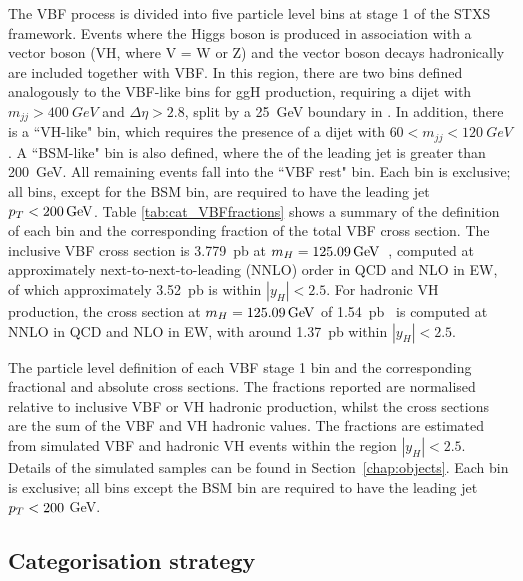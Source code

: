 The VBF process is divided into five particle level bins at stage 1 of the STXS framework.
Events where the Higgs boson is produced in association with a vector boson (VH, where V = W or Z) 
and the vector boson decays hadronically are included together with VBF.
In this region, there are two bins defined analogously to the VBF-like bins for ggH production, 
requiring a dijet with $m_{jj} > \SI{400}{GeV}$ and $\Delta\eta > 2.8$, 
split by a \SI{25}{GeV} boundary in \ptHjj.
In addition, there is a ``VH-like" bin, 
which requires the presence of a dijet with $60 < m_{jj} < \SI{120}{GeV}$. 
A ``BSM-like" bin is also defined, where the \pt of the leading jet is greater than \SI{200}{GeV}.
All remaining events fall into the ``VBF rest" bin.
Each bin is exclusive; all bins, except for the BSM bin, 
are required to have the leading jet $p_T < \SI{200}{GeV}$.
Table \ref{tab:cat_VBFfractions} shows a summary of the definition of each bin 
and the corresponding fraction of the total VBF cross section.
The inclusive VBF cross section is \SI{3.779}{pb} at $m_{H} = \SI{125.09}{GeV}$~\cite{YR4},
computed at approximately next-to-next-to-leading (NNLO) order in QCD and NLO in EW,
of which approximately \SI{3.52}{pb} is within $|y_H| < 2.5$.
For hadronic VH production, 
the cross section at $m_{H} = \SI{125.09}{GeV}$ of \SI{1.54}{pb}~\cite{YR4}
is computed at NNLO in QCD and NLO in EW, 
with around \SI{1.37}{pb} within $|y_H| < 2.5$.

\begin{table}
  \begin{centering}
    
    \caption[Particle level definitions of the VBF stage 1 STXS bins.]
    {
      The particle level definition of each VBF stage 1 bin 
      and the corresponding fractional and absolute cross sections.
      The fractions reported are normalised relative to inclusive VBF or VH hadronic production, 
      whilst the cross sections are the sum of the VBF and VH hadronic values.
      The fractions are estimated from simulated VBF and hadronic VH \Hgg events 
      within the region $|y_H| < 2.5$.
      Details of the simulated samples can be found in Section~\ref{chap:objects}.
      Each bin is exclusive; all bins except the BSM bin 
      are required to have the leading jet $p_T < 200$ GeV.
    }
    \label{tab:cat_VBFfractions}
  \end{centering}
\end{table}

\subsection{Categorisation strategy}

